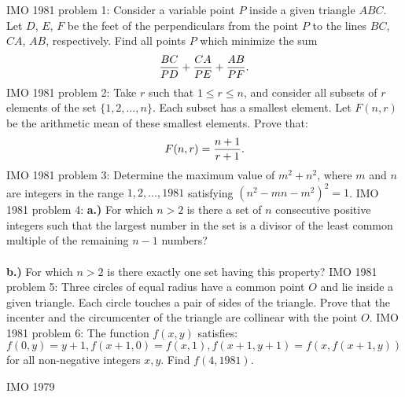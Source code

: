 IMO 1981 problem 1:  Consider a variable point $P$ inside a given triangle $ABC$. Let $D$, $E$, $F$ be the feet of the perpendiculars from the point $P$ to the lines $BC$, $CA$, $AB$, respectively. Find all points $P$ which minimize the sum
\[ {BC\over PD}+{CA\over PE}+{AB\over PF}. \] 
IMO 1981 problem 2:  Take $r$ such that $1\le r\le n$, and consider all subsets of $r$ elements of the set $\{1,2,\ldots,n\}$. Each subset has a smallest element. Let $F(n,r)$ be the arithmetic mean of these smallest elements. Prove that:
\[ F(n,r)={n+1\over r+1}. \] 
IMO 1981 problem 3:  Determine the maximum value of $m^2+n^2$, where $m$ and $n$ are integers in the range $1,2,\ldots,1981$ satisfying $(n^2-mn-m^2)^2=1$. 
IMO 1981 problem 4:  \textbf{a.)} For which $n>2$ is there a set of $n$ consecutive positive integers such that the largest number in the set is a divisor of the least common multiple of the remaining $n-1$ numbers? \\\\
\textbf{b.)} For which $n>2$ is there exactly one set having this property? 
IMO 1981 problem 5:  Three circles of equal radius have a common point $O$ and lie inside a given triangle. Each circle touches a pair of sides of the triangle. Prove that the incenter and the circumcenter of the triangle are collinear with the point $O$. 
IMO 1981 problem 6:  The function $f(x,y)$ satisfies: $f(0,y)=y+1, f(x+1,0) = f(x,1), f(x+1,y+1)=f(x,f(x+1,y))$ for all non-negative integers $x,y$. Find $f(4,1981)$. 


IMO 1979 

